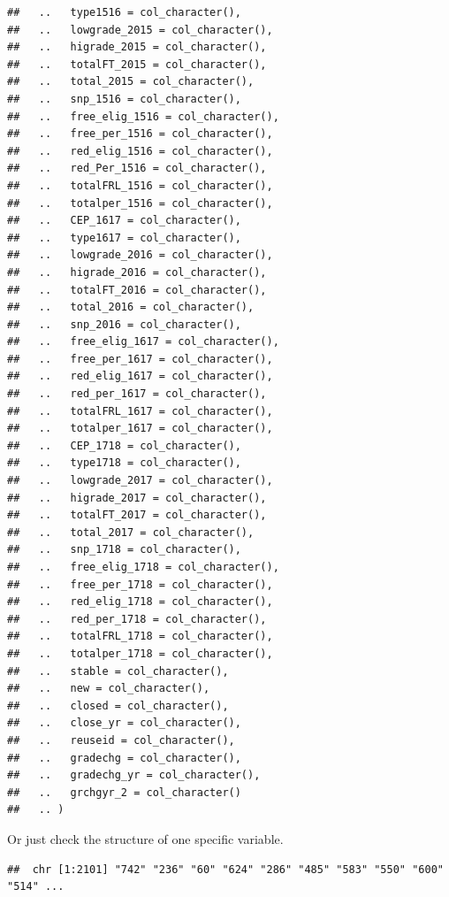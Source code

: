 \documentclass[
]{book}
\newenvironment{Shaded}{\begin{snugshade}}{\end{snugshade}}
\newcommand{\FunctionTok}[1]{\textcolor[rgb]{0.00,0.00,0.00}{#1}}
\newcommand{\NormalTok}[1]{#1}
\newcommand{\SpecialCharTok}[1]{\textcolor[rgb]{0.00,0.00,0.00}{#1}}
\begin{document}
\begin{verbatim}
##   ..   type1516 = col_character(),
##   ..   lowgrade_2015 = col_character(),
##   ..   higrade_2015 = col_character(),
##   ..   totalFT_2015 = col_character(),
##   ..   total_2015 = col_character(),
##   ..   snp_1516 = col_character(),
##   ..   free_elig_1516 = col_character(),
##   ..   free_per_1516 = col_character(),
##   ..   red_elig_1516 = col_character(),
##   ..   red_Per_1516 = col_character(),
##   ..   totalFRL_1516 = col_character(),
##   ..   totalper_1516 = col_character(),
##   ..   CEP_1617 = col_character(),
##   ..   type1617 = col_character(),
##   ..   lowgrade_2016 = col_character(),
##   ..   higrade_2016 = col_character(),
##   ..   totalFT_2016 = col_character(),
##   ..   total_2016 = col_character(),
##   ..   snp_2016 = col_character(),
##   ..   free_elig_1617 = col_character(),
##   ..   free_per_1617 = col_character(),
##   ..   red_elig_1617 = col_character(),
##   ..   red_per_1617 = col_character(),
##   ..   totalFRL_1617 = col_character(),
##   ..   totalper_1617 = col_character(),
##   ..   CEP_1718 = col_character(),
##   ..   type1718 = col_character(),
##   ..   lowgrade_2017 = col_character(),
##   ..   higrade_2017 = col_character(),
##   ..   totalFT_2017 = col_character(),
##   ..   total_2017 = col_character(),
##   ..   snp_1718 = col_character(),
##   ..   free_elig_1718 = col_character(),
##   ..   free_per_1718 = col_character(),
##   ..   red_elig_1718 = col_character(),
##   ..   red_per_1718 = col_character(),
##   ..   totalFRL_1718 = col_character(),
##   ..   totalper_1718 = col_character(),
##   ..   stable = col_character(),
##   ..   new = col_character(),
##   ..   closed = col_character(),
##   ..   close_yr = col_character(),
##   ..   reuseid = col_character(),
##   ..   gradechg = col_character(),
##   ..   gradechg_yr = col_character(),
##   ..   grchgyr_2 = col_character()
##   .. )
\end{verbatim}

Or just check the structure of one specific variable.

\begin{Shaded}
\end{Shaded}

\begin{verbatim}
##  chr [1:2101] "742" "236" "60" "624" "286" "485" "583" "550" "600" "514" ...
\end{verbatim}
\end{document}
